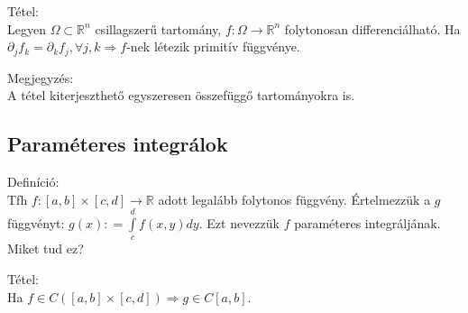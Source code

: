\documentclass[12pt,a4paper]{scrartcl}
\newenvironment{definicio}{}{}
\newenvironment{tetel}{}{}
\newenvironment{megjegyzes}{}{}
\begin{document}
\begin{tetel}

Tétel:\\
Legyen \(\Omega \subset {\mathbb{R}}^{n}\) csillagszerű tartomány,
\(\left. f:\Omega\rightarrow{\mathbb{R}}^{n} \right.\) folytonosan
differenciálható. Ha
\(\left. \partial_{j}f_{k} = \partial_{k}f_{j},\forall j,k\Rightarrow f \right.\)-nek
létezik primitív függvénye.

\end{tetel}

\begin{megjegyzes}

Megjegyzés:\\
A tétel kiterjeszthető egyszeresen összefüggő tartományokra is.

\end{megjegyzes}

\hypertarget{parameteres-integralok}{%
\subsection{Paraméteres integrálok}\label{parameteres-integralok}}

\begin{definicio}

Definíció:\\
Tfh
\(\left. f:\left\lbrack {a,b} \right\rbrack \times \left\lbrack {c,d} \right\rbrack\rightarrow{\mathbb{R}} \right.\)
adott legalább folytonos függvény. Értelmezzük a \(g\) függvényt:
\(g\left( x \right): = {\int\limits_{c}^{d}{f\left( {x,y} \right)dy}}\).
Ezt nevezzük \(f\) paraméteres integráljának. Miket tud ez?

\end{definicio}

\begin{tetel}

Tétel:\\
Ha
\(\left. f \in C\left( {\left\lbrack {a,b} \right\rbrack \times \left\lbrack {c,d} \right\rbrack} \right)\Rightarrow g \in C\left\lbrack {a,b} \right\rbrack \right.\).

\end{tetel}
\end{document}
